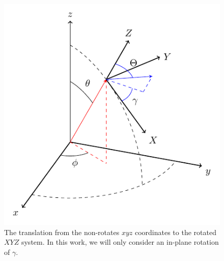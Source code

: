 \documentclass[aps,prb,10pt,letterpaper,notitlepage]{revtex4-1}
\begin{document}
\begin{figure}[b]
\centering
\includegraphics[width=0.4\linewidth]{axes}
\caption{The translation from the non-rotates $xyz$ coordinates to the rotated
$XYZ$ system. In this work, we will only consider an in-plane rotation of
$\gamma$.}
\label{fig:axes}
\end{figure}
\end{document}
